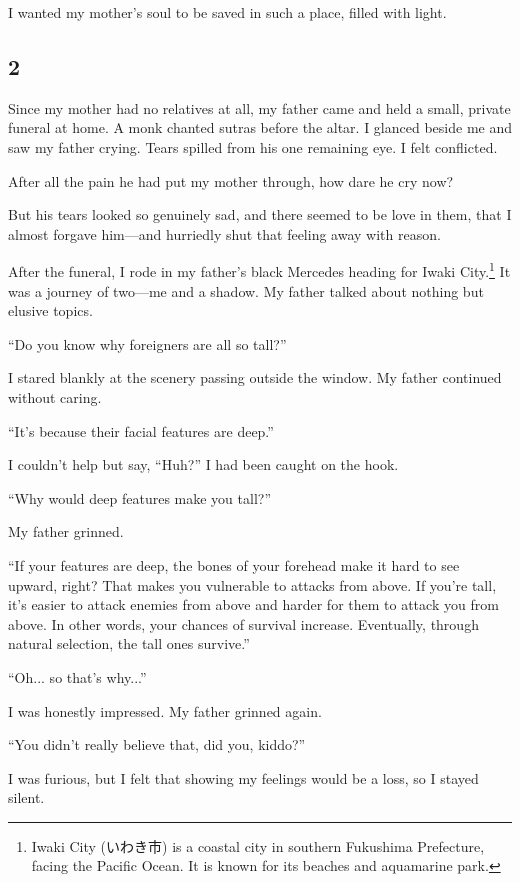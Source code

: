 \documentclass[
    a4paper,
    12pt,
    twoside,
    openany,
    UTF8,
    fontset=windows
]{ctexbook}
\begin{document}
I wanted my mother's soul to be saved in such a place, filled with light.


\subsection*{2}

Since my mother had no relatives at all, my father came and held a small, private funeral at home. A monk chanted sutras before the altar. I glanced beside me and saw my father crying. Tears spilled from his one remaining eye. I felt conflicted.

After all the pain he had put my mother through, how dare he cry now?

But his tears looked so genuinely sad, and there seemed to be love in them, that I almost forgave him---and hurriedly shut that feeling away with reason.

After the funeral, I rode in my father's black Mercedes heading for Iwaki City.\footnote{Iwaki City (いわき市) is a coastal city in southern Fukushima Prefecture, facing the Pacific Ocean. It is known for its beaches and aquamarine park.} It was a journey of two---me and a shadow. My father talked about nothing but elusive topics.

``Do you know why foreigners are all so tall?''

I stared blankly at the scenery passing outside the window. My father continued without caring.

``It's because their facial features are deep.''

I couldn't help but say, ``Huh?'' I had been caught on the hook.

``Why would deep features make you tall?''

My father grinned.

``If your features are deep, the bones of your forehead make it hard to see upward, right? That makes you vulnerable to attacks from above. If you're tall, it's easier to attack enemies from above and harder for them to attack you from above. In other words, your chances of survival increase. Eventually, through natural selection, the tall ones survive.''

``Oh... so that's why...''

I was honestly impressed. My father grinned again.

``You didn't really believe that, did you, kiddo?''

I was furious, but I felt that showing my feelings would be a loss, so I stayed silent.
\end{document}

